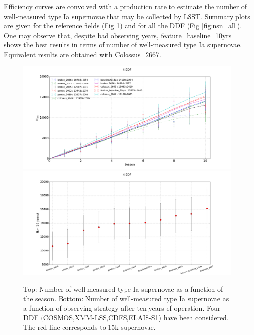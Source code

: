 \documentclass [11pt,a4paper]{article}
\newcommand{\cosmos}{COSMOS}
\newcommand{\xmmlss}{XMM-LSS}
\newcommand{\cdfs}{CDFS}
\newcommand{\elais}{ELAIS-S1}
\newcommand{\feature}{feature\_baseline\_10yrs}
\begin{document}
Efficiency curves are convolved with a production rate \cite{perrett} to estimate the number of well-measured type Ia supernovae that may be collected by LSST. Summary plots are given for the reference fields (Fig \ref{fig:nsn_four}) and for all the DDF (Fig \ref{fig:nsn_all}). One may observe that, despite bad observing years, \feature~ shows the best results in terms of number of well-measured type Ia supernovae. Equivalent results are obtained with Colossus\_2667.

\begin{figure}[htbp]
\begin{center}
  
  \includegraphics[width=15cm]{Figures/NSN_season_4DDF.png}
  \includegraphics[width=15cm]{Figures/NSN_all_4DDF.png}
 \caption{Top: Number of well-measured type Ia supernovae as a function of the season. Bottom: Number of  well-measured type Ia supernovae as a function of observing strategy after ten years of operation. Four DDF (\cosmos,\xmmlss,\cdfs,\elais) have been considered. The red line corresponds to 15k supernovae.}\label{fig:nsn_four}
\end{center}
\end{figure}
\end{document}
